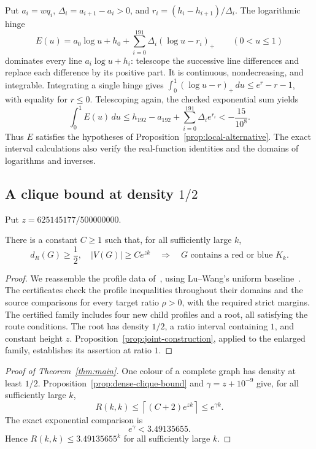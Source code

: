 Put $a_i=wq_i$, $\Delta_i=a_{i+1}-a_i>0$, and
$r_i=(h_i-h_{i+1})/\Delta_i$. The logarithmic hinge
\[
 E(u)=a_0\log u+h_0+
 \sum_{i=0}^{191}\Delta_i(\log u-r_i)_+
 \qquad(0<u\le1)
\]
dominates every line $a_i\log u+h_i$: telescope the successive line
differences and replace each difference by its positive part.
It is continuous, nondecreasing, and integrable. Integrating a single
hinge gives $\int_0^1(\log u-r)_+\,du\le e^r-r-1$, with equality
for $r\le0$. Telescoping again, the checked exponential sum yields
\begin{equation}\label{eq:certified-integral}
 \int_0^1E(u)\,du
 \le h_{192}-a_{192}+\sum_{i=0}^{191}\Delta_i e^{r_i}
 <-\frac{15}{10^8}.
\end{equation}
Thus $E$ satisfies the hypotheses of Proposition~\ref{prop:local-alternative}.
The exact interval calculations also verify the real-function identities
and the domains of logarithms and inverses.

\subsection{A clique bound at density \texorpdfstring{$1/2$}{1/2}}

Put $z=625145177/500000000$.
\begin{proposition}\label{prop:dense-clique-bound}
There is a constant $C\ge1$ such that, for all sufficiently large $k$,
\[
 d_R(G)\ge\frac12,\quad |V(G)|\ge Ce^{zk}
 \quad\Longrightarrow\quad
 G\text{ contains a red or blue }K_k.
\]
\end{proposition}
\begin{proof}

We reassemble the profile data of~\cite{ZBS}, using Lu--Wang's uniform
baseline~\cite[Lemma~B.1]{LW}. The certificates check the profile
inequalities throughout their domains and the source comparisons for
every target ratio $\rho>0$, with the required strict margins.
The certified family includes four new child profiles and a root,
all satisfying the route conditions.
The root has density $1/2$, a ratio interval containing $1$, and constant
height $z$. Proposition~\ref{prop:joint-construction}, applied to the
enlarged family, establishes its assertion at ratio $1$.
\end{proof}

\begin{proof}[Proof of Theorem~\ref{thm:main}]
One colour of a complete graph has density at least $1/2$.
Proposition~\ref{prop:dense-clique-bound} and $\gamma=z+10^{-9}$ give,
for all sufficiently large $k$,
\[
 R(k,k)\le\left\lceil(C+2)e^{zk}\right\rceil\le e^{\gamma k}.
\]
The exact exponential comparison is
\[
 e^\gamma<3.49135655.
\]
Hence $R(k,k)\le3.49135655^k$ for all sufficiently large $k$.
\end{proof}
